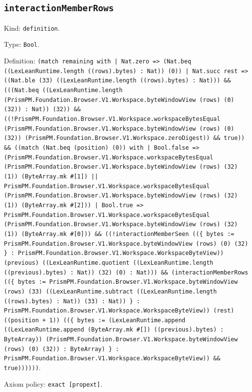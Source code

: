 \documentclass[11pt]{article}
\begin{document}
\subsection*{\texttt{interactionMemberRows}}
\noindent Kind: \texttt{definition}.\par
\noindent Type: \texttt{Bool}.\par
\noindent Definition: \texttt{(match remaining with | Nat.zero => (Nat.beq ((LexLeanRuntime.length ((rows).bytes) : Nat)) (0)) | Nat.succ rest => ((Nat.ble (33) ((LexLeanRuntime.length ((rows).bytes) : Nat))) \&\& (((Nat.beq ((LexLeanRuntime.length (PrismPM.Foundation.Browser.V1.Workspace.byteWindowView (rows) (0) (32)) : Nat)) (32)) \&\& ((!PrismPM.Foundation.Browser.V1.Workspace.workspaceBytesEqual (PrismPM.Foundation.Browser.V1.Workspace.byteWindowView (rows) (0) (32)) (PrismPM.Foundation.Browser.V1.Workspace.zeroDigest)) \&\& true)) \&\& ((match (Nat.beq (position) (0)) with | Bool.false => (PrismPM.Foundation.Browser.V1.Workspace.workspaceBytesEqual (PrismPM.Foundation.Browser.V1.Workspace.byteWindowView (rows) (32) (1)) (ByteArray.mk \#[1]) || PrismPM.Foundation.Browser.V1.Workspace.workspaceBytesEqual (PrismPM.Foundation.Browser.V1.Workspace.byteWindowView (rows) (32) (1)) (ByteArray.mk \#[2])) | Bool.true => PrismPM.Foundation.Browser.V1.Workspace.workspaceBytesEqual (PrismPM.Foundation.Browser.V1.Workspace.byteWindowView (rows) (32) (1)) (ByteArray.mk \#[0])) \&\& ((!interactionMemberSeen ((\{ bytes := PrismPM.Foundation.Browser.V1.Workspace.byteWindowView (rows) (0) (32) \} : PrismPM.Foundation.Browser.V1.Workspace.WorkspaceByteView)) (previous) ((LexLeanRuntime.quotient ((LexLeanRuntime.length ((previous).bytes) : Nat)) (32) (0) : Nat))) \&\& (interactionMemberRows ((\{ bytes := PrismPM.Foundation.Browser.V1.Workspace.byteWindowView (rows) (33) ((LexLeanRuntime.subtract ((LexLeanRuntime.length ((rows).bytes) : Nat)) (33) : Nat)) \} : PrismPM.Foundation.Browser.V1.Workspace.WorkspaceByteView)) (rest) ((position + 1)) ((\{ bytes := (LexLeanRuntime.append ((LexLeanRuntime.append (ByteArray.mk \#[]) ((previous).bytes) : ByteArray)) (PrismPM.Foundation.Browser.V1.Workspace.byteWindowView (rows) (0) (32)) : ByteArray) \} : PrismPM.Foundation.Browser.V1.Workspace.WorkspaceByteView)) \&\& true))))))}.\par
\noindent Axiom policy: \texttt{exact [propext]}.\par
\end{document}
